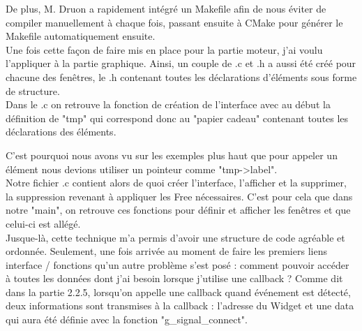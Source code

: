 \documentclass[11pt,french,a4paper]{report}
\begin{document}
De plus, M. Druon a rapidement intégré un Makefile afin de nous éviter de compiler manuellement à chaque fois, passant 
ensuite à CMake pour générer le Makefile automatiquement ensuite. \\
Une fois cette façon de faire mis en place pour la partie moteur, j'ai voulu l'appliquer à la partie
graphique. Ainsi, un couple de .c et .h a aussi été créé pour chacune des fenêtres, le .h contenant 
toutes les déclarations d'éléments sous forme de structure. \\

Dans le .c on retrouve la fonction de création de l'interface avec au début la définition de "tmp" qui correspond donc 
au "papier cadeau" contenant toutes les déclarations des éléments. 

C'est pourquoi nous avons vu sur les exemples plus haut 
que pour appeler un élément nous devions utiliser un pointeur comme "tmp->label". \\

Notre fichier .c contient alors de quoi créer l'interface, l'afficher et la supprimer, la suppression revenant à appliquer les 
Free  nécessaires. C'est pour cela que dans notre "main", on retrouve ces fonctions pour définir et afficher les fenêtres 
et que celui-ci est allégé. \\

Jusque-là, cette technique m'a permis d'avoir une structure de code agréable et ordonnée. Seulement, une fois arrivée au moment de 
faire les premiers liens interface / fonctions qu'un autre problème s'est posé : comment pouvoir accéder à toutes les données
dont j'ai besoin lorsque j'utilise une callback ? 
Comme dit dans la partie 2.2.5, lorsqu'on appelle une callback quand événement est détecté, deux informations sont 
transmises à la callback : l'adresse du Widget et une data qui aura été définie avec la fonction "g\_signal\_connect". \\
\end{document}
